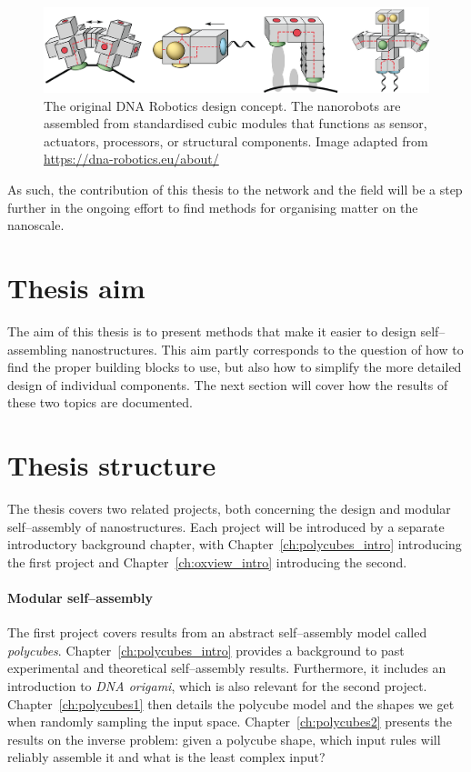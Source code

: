 \begin{figure}
    \centering\includegraphics[width=\textwidth]{figures/dnaRoboticsHeader.png} 
    \caption{The original DNA Robotics design concept. The nanorobots are assembled from standardised cubic modules that functions as sensor, actuators, processors, or structural components. Image adapted from \url{https://dna-robotics.eu/about/}}
    \label{fig:dnaRoboticsHeader}
\end{figure}

As such, the contribution of this thesis to the network and the field will be a step further in the ongoing effort to find methods for organising matter on the nanoscale.

\section{Thesis aim}
The aim of this thesis is to present methods that make it easier to design self--assembling nanostructures. This aim partly corresponds to the question of how to find the proper building blocks to use, but also how to simplify the more detailed design of individual components. The next section will cover how the results of these two topics are documented.

\section{Thesis structure}
The thesis covers two related projects, both concerning the design and modular self--assembly of nanostructures. Each project will be introduced by a separate introductory background chapter, with Chapter~\ref{ch:polycubes_intro} introducing the first project and Chapter~\ref{ch:oxview_intro} introducing the second.

\paragraph{Modular self--assembly}
The first project covers results from an abstract self--assembly model called \emph{polycubes}. Chapter~\ref{ch:polycubes_intro} provides a background to past experimental and theoretical self--assembly results. Furthermore, it includes an introduction to \emph{DNA origami}, which is also relevant for the second project. Chapter~\ref{ch:polycubes1} then details the polycube model and the shapes we get when randomly sampling the input space. Chapter~\ref{ch:polycubes2} presents the results on the inverse problem: given a polycube shape, which input rules will reliably assemble it and what is the least complex input?

